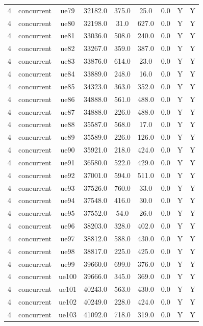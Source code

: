 \begin{table}[ht]
\begin{tabular}{|c|c|c|c|c|c|c|c|c|}
4 & concurrent & ue79 & 32182.0 & 375.0 & 25.0 & 0.0 & Y & Y \\
4 & concurrent & ue80 & 32198.0 & 31.0 & 627.0 & 0.0 & Y & Y \\
4 & concurrent & ue81 & 33036.0 & 508.0 & 240.0 & 0.0 & Y & Y \\
4 & concurrent & ue82 & 33267.0 & 359.0 & 387.0 & 0.0 & Y & Y \\
4 & concurrent & ue83 & 33876.0 & 614.0 & 23.0 & 0.0 & Y & Y \\
4 & concurrent & ue84 & 33889.0 & 248.0 & 16.0 & 0.0 & Y & Y \\
4 & concurrent & ue85 & 34323.0 & 363.0 & 352.0 & 0.0 & Y & Y \\
4 & concurrent & ue86 & 34888.0 & 561.0 & 488.0 & 0.0 & Y & Y \\
4 & concurrent & ue87 & 34888.0 & 226.0 & 488.0 & 0.0 & Y & Y \\
4 & concurrent & ue88 & 35587.0 & 568.0 & 17.0 & 0.0 & Y & Y \\
4 & concurrent & ue89 & 35589.0 & 226.0 & 126.0 & 0.0 & Y & Y \\
4 & concurrent & ue90 & 35921.0 & 218.0 & 424.0 & 0.0 & Y & Y \\
4 & concurrent & ue91 & 36580.0 & 522.0 & 429.0 & 0.0 & Y & Y \\
4 & concurrent & ue92 & 37001.0 & 594.0 & 511.0 & 0.0 & Y & Y \\
4 & concurrent & ue93 & 37526.0 & 760.0 & 33.0 & 0.0 & Y & Y \\
4 & concurrent & ue94 & 37548.0 & 416.0 & 30.0 & 0.0 & Y & Y \\
4 & concurrent & ue95 & 37552.0 & 54.0 & 26.0 & 0.0 & Y & Y \\
4 & concurrent & ue96 & 38203.0 & 328.0 & 402.0 & 0.0 & Y & Y \\
4 & concurrent & ue97 & 38812.0 & 588.0 & 430.0 & 0.0 & Y & Y \\
4 & concurrent & ue98 & 38817.0 & 225.0 & 425.0 & 0.0 & Y & Y \\
4 & concurrent & ue99 & 39660.0 & 699.0 & 376.0 & 0.0 & Y & Y \\
4 & concurrent & ue100 & 39666.0 & 345.0 & 369.0 & 0.0 & Y & Y \\
4 & concurrent & ue101 & 40243.0 & 563.0 & 430.0 & 0.0 & Y & Y \\
4 & concurrent & ue102 & 40249.0 & 228.0 & 424.0 & 0.0 & Y & Y \\
4 & concurrent & ue103 & 41092.0 & 718.0 & 319.0 & 0.0 & Y & Y \\

\end{tabular}
\end{table}
